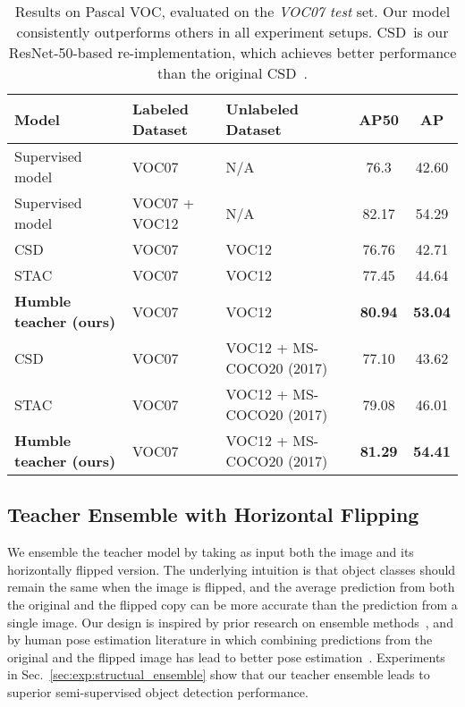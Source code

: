 \documentclass[final]{cvpr}
\begin{document}
\begin{table*}\centering
  \begin{tabular}{lllcc}
    \toprule
    Model & Labeled Dataset & Unlabeled Dataset & AP50 & AP  \\
    \midrule
    Supervised model & VOC07 & N/A & 76.3 & 42.60 \\
    Supervised model & VOC07 + VOC12 & N/A & 82.17 & 54.29\\
    \midrule
    CSD & VOC07 & VOC12 & 76.76 & 42.71 \\
    STAC~\cite{sohn2020simple} & VOC07 & VOC12 & 77.45 & 44.64\\
    \textbf{Humble teacher (ours)} & VOC07 & VOC12 & \textbf{80.94} & \textbf{53.04}\\
    \midrule
    CSD & VOC07 & VOC12 + MS-COCO20 (2017) & 77.10 & 43.62\\
    STAC~\cite{sohn2020simple} & VOC07 & VOC12 + MS-COCO20 (2017) & 79.08 & 46.01\\
    \textbf{Humble teacher (ours)} & VOC07 & VOC12 + MS-COCO20 (2017)& \textbf{81.29} & \textbf{54.41}\\
    \bottomrule
  \end{tabular}
  \caption{Results on Pascal VOC, evaluated on the \emph{VOC07 test} set. Our model consistently outperforms others in all experiment setups. CSD~is our ResNet-50-based re-implementation, which achieves better performance than the original CSD~\cite{jeong2019consistency}.}
  \label{tab:pascal_voc}
\end{table*}

\subsection{Teacher Ensemble with Horizontal Flipping}
\label{sec:teacher_ensemble}
We ensemble the teacher model by taking as input both the image and its horizontally flipped version.
The underlying intuition is that object classes should remain the same when the image is flipped, and the average prediction from both the original and the flipped copy can be more accurate than the prediction from a single image. Our design is inspired by prior research on ensemble methods~\cite{rokach2010ensemble,radosavovic2018data,zou2019learning}, and by human pose estimation literature in which combining predictions from the original and the flipped image has lead to better pose estimation~\cite{newell2016stacked,sun2018integral,chen2018cascaded}.
Experiments in Sec.~\ref{sec:exp:structual_ensemble} show that our teacher ensemble leads to superior semi-supervised object detection performance.
\end{document}
